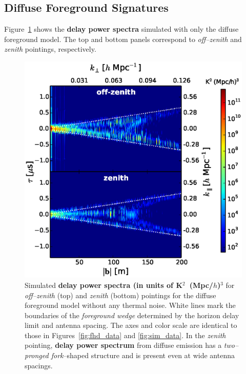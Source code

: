 \documentclass[preprint2,iop,numberedappendix]{emulateapj}
\begin{document}
\subsection{Diffuse Foreground Signatures}\label{sec:diffuse}

Figure~\ref{fig:noiseless-dsm-delay-spectrum} shows the {\bf delay power spectra} simulated with only the diffuse foreground model. The top and bottom panels correspond to {\it off--zenith} and {\it zenith} pointings, respectively. 

\begin{figure}[htb]
\centering
\includegraphics[width=\linewidth]{fig9.eps}
\caption{Simulated {\bf delay power spectra (in units of K$^2$~(Mpc/$h$)$^3$} for {\it off--zenith} (top) and {\it zenith} (bottom) pointings for the diffuse foreground model without any thermal noise. White lines mark the boundaries of the {\it foreground wedge} determined by the horizon delay limit and antenna spacing. The axes and color scale are identical to those in Figures~\ref{fig:fhd_data} and \ref{fig:sim_data}. In the {\it zenith} pointing, {\bf delay power spectrum} from diffuse emission has a {\it two--pronged fork}--shaped structure and is present even at wide antenna spacings. \label{fig:noiseless-dsm-delay-spectrum}}
\end{figure}
\end{document}
